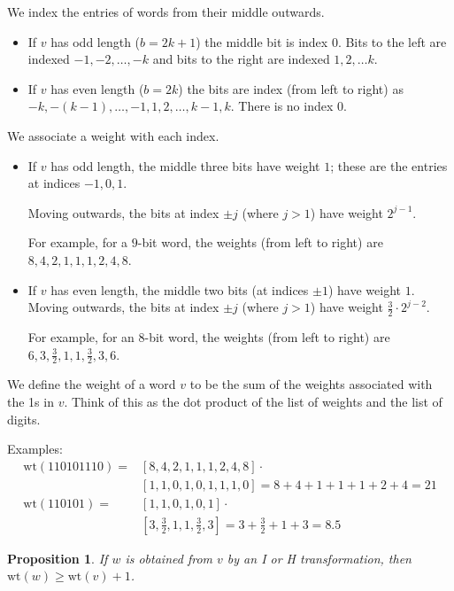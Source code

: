 \documentclass[12pt]{article}
\newtheorem{prop}[conj]{Proposition}
\newcommand{\weight}[1]{\mathrm{wt}(#1)}
\begin{document}
We index the entries of words from their middle outwards. 
\begin{itemize}
\item If $v$ has odd length ($b=2k+1$) the middle bit is index
  $0$. Bits to the left are indexed $-1,-2,\ldots,-k$ and bits to the
  right are indexed $1,2,\ldots k$.

\item If $v$ has even length ($b=2k$) the bits are index (from left to
  right) as $-k,-(k-1), \ldots,-1,1,2,\ldots,k-1,k$. There is no index
  $0$. 
\end{itemize}

We associate a weight with each index.
\begin{itemize}
\item If $v$ has odd length, the middle three bits have weight
  $1$; these are the entries at indices $-1,0,1$. 

  Moving outwards, the bits at index $\pm j$ (where $j>1$) have weight
  $2^{j-1}$. 

  For example, for a $9$-bit word, the weights (from left to right)
  are $8,4,2,1,1,1,2,4,8$.

\item If $v$ has even length, the middle two bits (at indices $\pm1$)
  have weight $1$. Moving outwards, the bits at index $\pm j$
  (where $j>1$) have weight $\frac32\cdot2^{j-2}$. 

  For example, for an $8$-bit word, the weights (from left to right)
  are $6,3,\frac32,1,1,\frac32,3,6$.
\end{itemize}

We define the weight of a word $v$ to be the sum of the weights
associated with the 1s in $v$. Think of this as the dot product of the
list of weights and the list of digits. 


Examples:
\[
\begin{aligned}
  \weight{110101110} =& [8,4,2,1,1,1,2,4,8]\cdot \\
  &[1,1,0,1,0,1,1,1,0] 
  = 8+4+1+1+1+2+4 = 21 
  \\[6pt]
  \weight{110101} =& [1,1,0,1,0,1] \cdot\\
  &[3,\tfrac32,1,1,\tfrac32,3] = 3 + \tfrac32 + 1 + 3 = 8.5
\end{aligned}
\]

\begin{prop}\label{prop:wt+1}
  If $w$ is obtained from $v$ by an I or H transformation, then 
  $\weight w \ge \weight v + 1$.
\end{prop}
\end{document}
